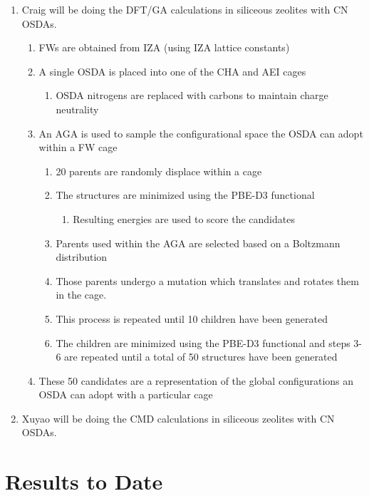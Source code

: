 \documentclass[journal=accacs,manuscript=article, email=true, layout=traditional]{achemso}
\begin{document}
\begin{enumerate}
\item Craig will be doing the DFT/GA calculations in siliceous zeolites with CN OSDAs.
\begin{enumerate}
\item FWs are obtained from IZA (using IZA lattice constants)
\item A single OSDA is placed into one of the CHA and AEI cages
\begin{enumerate}
\item OSDA nitrogens are replaced with carbons to maintain charge neutrality
\end{enumerate}
\item An AGA is used to sample the configurational space the OSDA can adopt within a FW cage
\begin{enumerate}
\item 20 parents are randomly displace within a cage
\item The structures are minimized using the PBE-D3 functional
\begin{enumerate}
\item Resulting energies are used to score the candidates
\end{enumerate}
\item Parents used within the AGA are selected based on a Boltzmann distribution
\item Those parents undergo a mutation which translates and rotates them in the cage.
\item This process is repeated until 10 children have been generated
\item The children are minimized using the PBE-D3 functional and steps 3-6 are repeated until a total of 50 structures have been generated
\end{enumerate}
\item These 50 candidates are a representation of the global configurations an OSDA can adopt with a particular cage
\end{enumerate}

\item Xuyao will be doing the CMD calculations in siliceous zeolites with CN OSDAs.
\end{enumerate}






\section{Results to Date}
\label{sec:orgee7dc6c}
\end{document}
